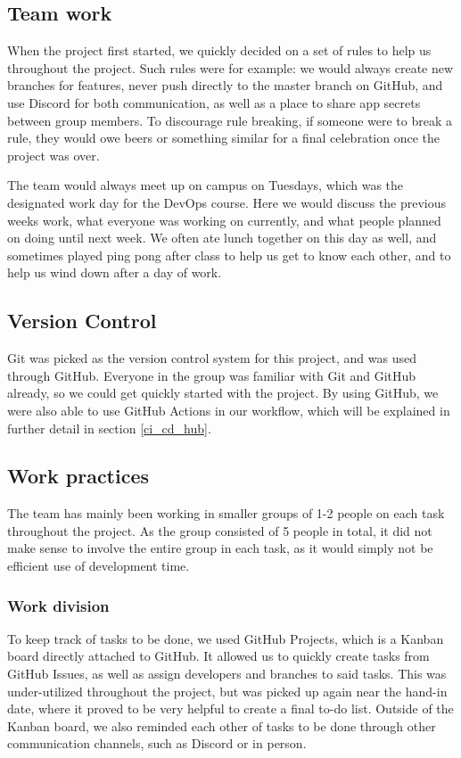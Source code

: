 \subsection{Team work}
When the project first started, we quickly decided on a set of rules to help us throughout the project. Such rules were for example: we would always create new branches for features, never push directly to the master branch on GitHub, and use Discord for both communication, as well as a place to share app secrets between group members. To discourage rule breaking, if someone were to break a rule, they would owe beers or something similar for a final celebration once the project was over.

The team would always meet up on campus on Tuesdays, which was the designated work day for the DevOps course. Here we would discuss the previous weeks work, what everyone was working on currently, and what people planned on doing until next week. We often ate lunch together on this day as well, and sometimes played ping pong after class to help us get to know each other, and to help us wind down after a day of work.

\subsection{Version Control}
Git was picked as the version control system for this project, and was used through GitHub. Everyone in the group was familiar with Git and GitHub already, so we could get quickly started with the project. By using GitHub, we were also able to use GitHub Actions in our workflow, which will be explained in further detail in section \ref{ci_cd_hub}.

\subsection{Work practices}
The team has mainly been working in smaller groups of 1-2 people on each task throughout the project. As the group consisted of 5 people in total, it did not make sense to involve the entire group in each task, as it would simply not be efficient use of development time.

\subsubsection{Work division}
To keep track of tasks to be done, we used GitHub Projects, which is a Kanban board directly attached to GitHub. It allowed us to quickly create tasks from GitHub Issues, as well as assign developers and branches to said tasks. This was under-utilized throughout the project, but was picked up again near the hand-in date, where it proved to be very helpful to create a final to-do list. Outside of the Kanban board, we also reminded each other of tasks to be done through other communication channels, such as Discord or in person.


